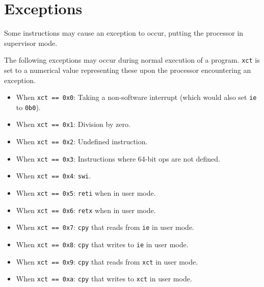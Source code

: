 \documentclass{article}
\begin{document}
\section{Exceptions}
	Some instructions may cause an exception to occur, putting the
	processor in supervisor mode.

	The following exceptions may occur during normal execution of a
	program. \texttt{xct} is set to a numerical value representing these
	upon the processor encountering an exception. 

	\begin{itemize}
	\item When \texttt{xct == 0x0}:
		Taking a non-software interrupt (which would also set \texttt{ie}
		to \texttt{0b0}).
	\item When \texttt{xct == 0x1}: Division by zero.
	\item When \texttt{xct == 0x2}: Undefined instruction.
	\item When \texttt{xct == 0x3}:
		Instructions where 64-bit ops are not defined.
	\item When \texttt{xct == 0x4}: \texttt{swi}.
	\item When \texttt{xct == 0x5}: \texttt{reti} when in user mode.
	\item When \texttt{xct == 0x6}: \texttt{retx} when in user mode.

	\item When \texttt{xct == 0x7}:
		\texttt{cpy} that reads from \texttt{ie} in user mode.
	\item When \texttt{xct == 0x8}:
		\texttt{cpy} that writes to \texttt{ie} in user mode.
	\item When \texttt{xct == 0x9}:
		\texttt{cpy} that reads from \texttt{xct} in user mode.
	\item When \texttt{xct == 0xa}:
		\texttt{cpy} that writes to \texttt{xct} in user mode.




\end{itemize}
\end{document}
